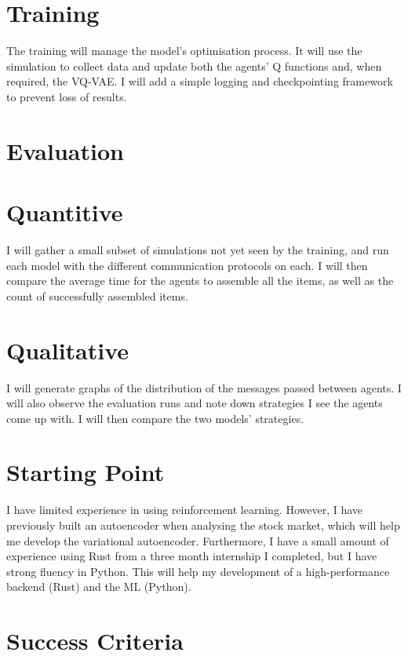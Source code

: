 \section*{Training}
The training will manage the model's optimisation process. It will use the simulation to collect data and update both the agents' Q functions and, when required, the VQ-VAE. I will add a simple logging and checkpointing framework to prevent loss of results.

\section{Evaluation}

\section*{Quantitive}
I will gather a small subset of simulations not yet seen by the training, and run each model with the different communication protocols on each. I will then compare the average time for the agents to assemble all the items, as well as the count of successfully assembled items.

\section*{Qualitative}
I will generate graphs of the distribution of the messages passed between agents. I will also observe the evaluation runs and note down strategies I see the agents come up with. I will then compare the two models' strategies.


\section{Starting Point}
I have limited experience in using reinforcement learning. However, I have previously built an autoencoder when analysing the stock market, which will help me develop the variational autoencoder. Furthermore, I have a small amount of experience using Rust from a three month internship I completed, but I have strong fluency in Python. This will help my development of a high-performance backend (Rust) and the ML (Python).


\section{Success Criteria}

